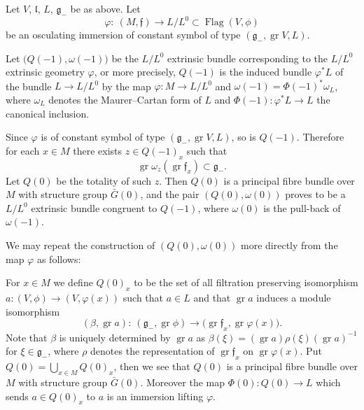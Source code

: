 \documentclass[10pt,a4paper]{amsart}
\newcommand{\geneg}{\mathfrak g _-}
\newcommand{\f}{\mathfrak f}
\newcommand{\g}{\mathfrak g}
\newcommand{\lf}{\mathfrak l}
\newcommand{\Flag}{\operatorname{Flag}}
\newcommand{\gr}{\operatorname{gr}}
\numberwithin{equation}{section}
\begin{document}
Let $V$, $\lf$, $L$, $\geneg $ be as above. Let
\[
\varphi\colon\ (M, \f) \to L/L^0 \subset \Flag(V, \phi)
\]
be an osculating immersion of constant symbol of type $(\geneg, \gr V, L)$.

Let $\big(Q(-1), \omega (-1)\big)$ be the $L/L^0$ extrinsic bundle corresponding to
the $L/L^0$ extrinsic geo\-met\-ry $\varphi$, or more precisely, $Q(-1)$ is the induced bundle $\varphi^*L$ of the bundle $L \to L/L^0$
by the map $\varphi\colon M \to L/L^0$ and
$\omega(-1)= \Phi(-1)^*\omega_L$,
where $\omega_L$ denotes the Maurer--Cartan form of $L$ and
$\Phi(-1)\colon\varphi^*L \to L$ the canonical inclusion.

Since $\varphi$ is of constant symbol of type $(\geneg, \gr V, L)$, so is
$Q(-1)$. Therefore for each $x \in M$ there exists $z\in Q(-1)_x$ such that
\[
\gr \omega_z (\gr \f_x) \subset \g _-.
\]
Let $Q(0)$ be the totality of such $z $. Then $Q(0)$ is a principal fibre bundle over$M$ with structure group $\bar G(0) $, and the pair $(Q(0), \omega(0))$ proves to be a $L/L^0$ extrinsic bundle congruent to $Q(-1)$, where $\omega(0)$ is the pull-back of $\omega(-1)$.

We may repeat the construction of $ (Q(0), \omega(0))$
more directly from the map $\varphi $ as follows:

For $x \in M $ we define $Q(0)_x $ to be the set of all filtration preserving isomorphism $a\colon (V, \phi) \to (V, \varphi(x))$ such that $a \in L$ and that $\gr a $ induces a module isomorphism
\[
(\beta, \gr a)\colon\ (\geneg, \gr \phi) \to \big( \gr \f_x, \gr \varphi(x)\big).
\]
Note that $\beta$ is uniquely determined by $\gr a$
as $\beta (\xi) = (\gr a) \rho ( \xi) (\gr a) ^{-1}$ for $ \xi \in \geneg $, where $\rho$ denotes the representation of $\gr \f_x$ on $\gr \varphi(x)$. Put $Q(0) = \bigcup_{x \in M} Q(0)_x $, then we see that $Q(0)$ is a principal fibre bundle over $M$ with structure group $\bar{G}(0)$. Moreover the map $\Phi (0)\colon Q(0) \to L $ which sends $a \in Q(0)_x$ to $a$ is an immersion lifting $\varphi$.
\end{document}
